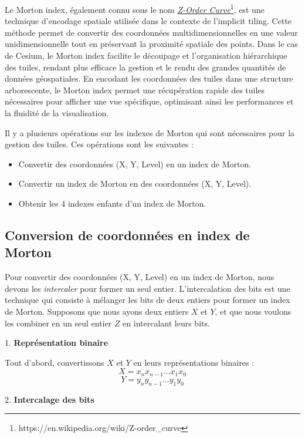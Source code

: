 Le Morton index, également connu sous le nom \href{https://en.wikipedia.org/wiki/Z-order\_curve}{\textit{Z-Order Curve}}\footnote{{https://en.wikipedia.org/wiki/Z-order\_curve}}, est une technique d'encodage spatiale utilisée dans le contexte de l'implicit tiling. Cette méthode permet de convertir des coordonnées multidimensionnelles en une valeur unidimensionnelle tout en préservant la proximité spatiale des points. Dans le cas de Cesium, le Morton index facilite le découpage et l'organisation hiérarchique des tuiles, rendant plus efficace la gestion et le rendu des grandes quantités de données géospatiales. En encodant les coordonnées des tuiles dans une structure arborescente, le Morton index permet une récupération rapide des tuiles nécessaires pour afficher une vue spécifique, optimisant ainsi les performances et la fluidité de la visualisation.

Il y a plusieurs opérations sur les indexes de Morton qui sont nécessaires pour la gestion des tuiles. Ces opérations sont les suivantes :

\begin{itemize}
    \item Convertir des coordonnées (X, Y, Level) en un index de Morton.
    \item Convertir un index de Morton en des coordonnées (X, Y, Level).
    \item Obtenir les 4 indexes enfants d'un index de Morton.
\end{itemize}

\subsection*{Conversion de coordonnées en index de Morton}

Pour convertir des coordonnées (X, Y, Level) en un index de Morton, nous devons les \textit{intercaler} pour former un seul entier. L'intercalation des bits est une technique qui consiste à mélanger les bits de deux entiers pour former un index de Morton. Supposons que nous ayons deux entiers \( X \) et \( Y \), et que nous voulons les combiner en un seul entier \( Z \) en intercalant leurs bits.

1. \textbf{Représentation binaire}

   Tout d'abord, convertissons \( X \) et \( Y \) en leurs représentations binaires :
   \[
   X = x_n x_{n-1} \ldots x_1 x_0
   \]
   \[
   Y = y_n y_{n-1} \ldots y_1 y_0
   \]

2. \textbf{Intercalage des bits}

